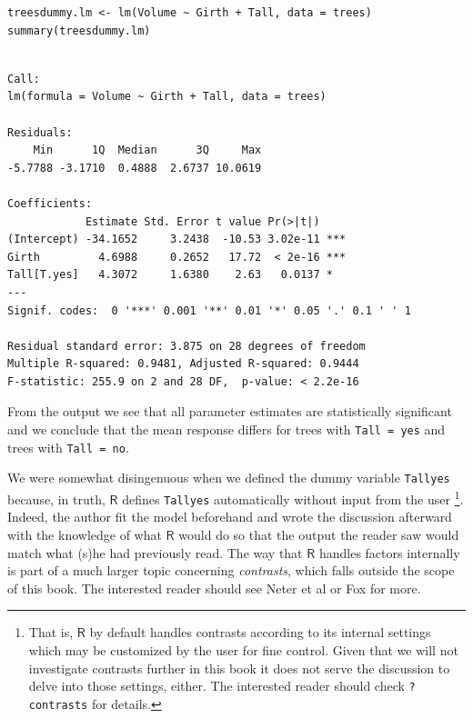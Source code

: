\documentclass[captions=tableheading]{scrbook}
\begin{document}
\lstset{language=R}
\begin{lstlisting}
treesdummy.lm <- lm(Volume ~ Girth + Tall, data = trees)
summary(treesdummy.lm)
\end{lstlisting}


\begin{verbatim}

Call:
lm(formula = Volume ~ Girth + Tall, data = trees)

Residuals:
    Min      1Q  Median      3Q     Max 
-5.7788 -3.1710  0.4888  2.6737 10.0619 

Coefficients:
            Estimate Std. Error t value Pr(>|t|)    
(Intercept) -34.1652     3.2438  -10.53 3.02e-11 ***
Girth         4.6988     0.2652   17.72  < 2e-16 ***
Tall[T.yes]   4.3072     1.6380    2.63   0.0137 *  
---
Signif. codes:  0 '***' 0.001 '**' 0.01 '*' 0.05 '.' 0.1 ' ' 1 

Residual standard error: 3.875 on 28 degrees of freedom
Multiple R-squared: 0.9481,	Adjusted R-squared: 0.9444 
F-statistic: 255.9 on 2 and 28 DF,  p-value: < 2.2e-16
\end{verbatim}

From the output we see that all parameter estimates are statistically significant and we conclude that the mean response differs for trees with \texttt{Tall = yes} and trees with \texttt{Tall = no}.

\begin{rem}
We were somewhat disingenuous when we defined the dummy variable \texttt{Tallyes} because, in truth, \(\mathsf{R}\) defines \texttt{Tallyes} automatically without input from the user
\footnote{That is, \(\mathsf{R}\) by default handles contrasts according to its internal settings which may be customized by the user for fine control. Given that we will not investigate contrasts further in this book it does not serve the discussion to delve into those settings, either. The interested reader should check \texttt{?contrasts} for details.}. 
Indeed, the author fit the model beforehand and wrote the discussion afterward with the knowledge of what \(\mathsf{R}\) would do so that the output the reader saw would match what (s)he had previously read. The way that \(\mathsf{R}\) handles factors internally is part of a much larger topic concerning \emph{contrasts}, which falls outside the scope of this book. The interested reader should see Neter et al \cite{Neter1996} or Fox \cite{Fox1997} for more. 
\end{rem}
\end{document}
